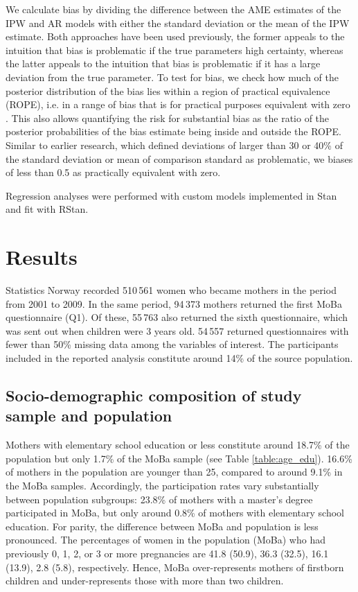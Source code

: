 \documentclass[]{article}
\begin{document}
We calculate bias by dividing the difference between the AME estimates of the IPW and AR models with either the standard deviation or the mean of the IPW estimate. Both approaches have been used previously\supercite{Stuart2010-cj,Nilsen2009-ci}, the former appeals to the intuition that bias is problematic if the true parameters high certainty, whereas the latter appeals to the intuition that bias is problematic if it has a large deviation from the true parameter. To test for bias, we check how much of the posterior distribution of the bias lies within a region of practical equivalence (ROPE), i.e. in a range of bias that is for practical purposes equivalent with zero \supercite{Kruschke2010-zi, Mascha2011-um}. This also allows quantifying the risk for substantial bias as the ratio of the posterior probabilities of the bias estimate being inside and outside the ROPE. Similar to earlier research, which defined deviations of larger than 30 or 40\% of the standard deviation or mean of comparison standard as problematic\supercite{Stuart2010-cj,Nohr2006-uf}, we biases of less than 0.5 as practically equivalent with zero.

Regression analyses were performed with custom models implemented in Stan \supercite{Stan_Development_Team2017-lp} and fit with RStan\supercite{Stan_Development_Team2017-lp}.

\section{Results}

Statistics Norway recorded 510\,561 women who became mothers in the period from 2001 to 2009. In the same period, 94\,373 mothers returned the first MoBa questionnaire (Q1). Of these, 55\,763 also returned the sixth questionnaire,  which was sent out when  children were 3 years old. 54\,557 returned questionnaires with fewer than 50\% missing data among the variables of interest. The participants included in the reported analysis constitute around 14\% of the source population.

\subsection*{Socio-demographic composition of study sample and population}
 Mothers with elementary school education or less constitute around 18.7\% of the population but only 1.7\% of the MoBa sample (see Table \ref{table:age_edu}). 16.6\% of mothers in the population are younger than 25, compared to around 9.1\% in the MoBa samples. Accordingly, the participation rates vary substantially between population subgroups: 23.8\% of mothers with a master's degree participated in MoBa, but only around 0.8\% of mothers with elementary school education. For parity, the difference between MoBa and population is less pronounced. The percentages of women in the population (MoBa) who had previously 0, 1, 2, or 3 or more pregnancies are 41.8 (50.9), 36.3 (32.5), 16.1 (13.9), 2.8 (5.8), respectively. Hence, MoBa over-represents mothers of firstborn children and under-represents those with more than two children.
\end{document}
